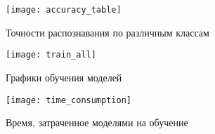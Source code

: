 \begin{figure}[H]
    \centering
    \texttt{[image: accuracy\_table]}
    \vspace*{-2cm}
    \caption{Точности распознавания по различным классам}
    \label{table-accuracy}
\end{figure}

\begin{figure}[H]
    \centering
    \texttt{[image: train\_all]}
    \vspace*{-1.3cm}
    \caption{Графики обучения моделей}
    \label{fig:train_all}
\end{figure}

\begin{figure}[H]
    \centering
    \texttt{[image: time\_consumption]}
    \vspace*{-0.5cm}
    \caption{Время, затраченное моделями на обучение}
    \label{time_consumption}
\end{figure}
\clearpage



